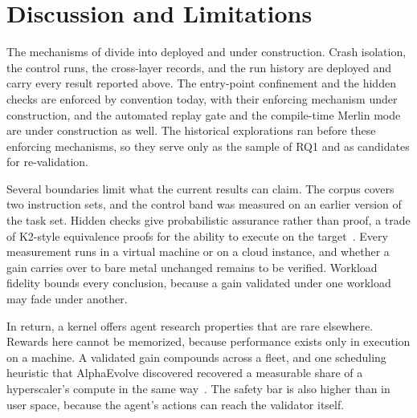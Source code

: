 \section{Discussion and Limitations}\label{sec:discussion}

The mechanisms of \sys divide into deployed and under construction.
Crash isolation, the control runs, the cross-layer records, and the run history are deployed and carry every result reported above.
The entry-point confinement and the hidden checks are enforced by convention today, with their enforcing mechanism under construction, and the automated replay gate and the compile-time Merlin mode are under construction as well.
The historical explorations ran before these enforcing mechanisms, so they serve only as the sample of RQ1 and as candidates for re-validation.

Several boundaries limit what the current results can claim.
The corpus covers two instruction sets, and the control band was measured on an earlier version of the task set.
Hidden checks give probabilistic assurance rather than proof, a trade of K2-style equivalence proofs for the ability to execute on the target~\cite{xu2021synthesizing}.
Every measurement runs in a virtual machine or on a cloud instance, and whether a gain carries over to bare metal unchanged remains to be verified.
Workload fidelity bounds every conclusion, because a gain validated under one workload may fade under another.

In return, a kernel offers agent research properties that are rare elsewhere.
Rewards here cannot be memorized, because performance exists only in execution on a machine.
A validated gain compounds across a fleet, and one scheduling heuristic that AlphaEvolve discovered recovered a measurable share of a hyperscaler's compute in the same way~\cite{deepmind2025alphaevolve}.
The safety bar is also higher than in user space, because the agent's actions can reach the validator itself.
